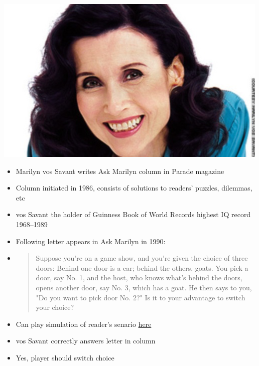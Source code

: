 \documentclass[handout]{beamer}
\theoremstyle{definition}
\begin{document}
\begin{frame}
\begin{center}\includegraphics[scale=.5]{VosSavant}\end{center}
\begin{itemize}
\item Marilyn vos Savant writes \alert{Ask Marilyn}
column in \alert{Parade} magazine
\item Column initiated in 1986, consists of solutions
to readers' puzzles, dilemmas, etc
\item vos Savant the holder of \alert{Guinness Book of World Records}
highest IQ record 1968--1989
\end{itemize}
\end{frame}

\begin{frame}
\begin{itemize}
\item Following letter appears in \alert{Ask Marilyn} in 1990:
\item\begin{quotation}
Suppose you're on a game show, and you're given the choice of three
doors: Behind one door is a car; behind the others, goats. You pick
a door, say No. 1, and the host, who knows what's behind the doors,
opens another door, say No. 3, which has a goat. He then says to
you, "Do you want to pick door No. 2?" Is it to your advantage to
switch your choice?
\end{quotation}
\item Can play simulation of reader's senario
\href{http://math.ucsd.edu/~crypto/Monty/monty.html}
{\color{blue}here}
\item vos Savant correctly answers letter in column
\item \alert{Yes}, player should switch choice
\end{itemize}
\end{frame}
\end{document}
